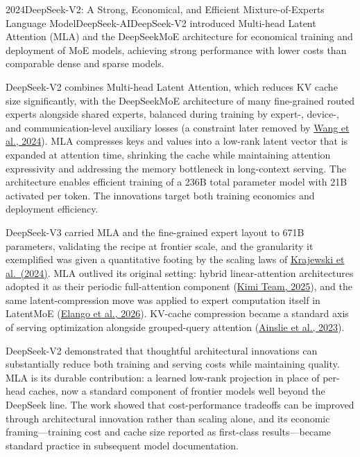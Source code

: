 
\begin{papersummary}{2024}{DeepSeek-V2: A Strong, Economical, and Efficient Mixture-of-Experts Language Model}{DeepSeek-AI}{DeepSeek-V2 introduced Multi-head Latent Attention (MLA) and the DeepSeekMoE architecture for economical training and deployment of MoE models, achieving strong performance with lower costs than comparable dense and sparse models.}

DeepSeek-V2 combines Multi-head Latent Attention, which reduces KV cache size significantly, with the DeepSeekMoE architecture of many fine-grained routed experts alongside shared experts, balanced during training by expert-, device-, and communication-level auxiliary losses (a constraint later removed by \hyperref[paper:wang-2024-auxfree]{Wang et al., 2024}). MLA compresses keys and values into a low-rank latent vector that is expanded at attention time, shrinking the cache while maintaining attention expressivity and addressing the memory bottleneck in long-context serving. The architecture enables efficient training of a 236B total parameter model with 21B activated per token. The innovations target both training economics and deployment efficiency.

DeepSeek-V3 carried MLA and the fine-grained expert layout to 671B parameters, validating the recipe at frontier scale, and the granularity it exemplified was given a quantitative footing by the scaling laws of \hyperref[paper:krajewski-2024]{Krajewski et al.\ (2024)}. MLA outlived its original setting: hybrid linear-attention architectures adopted it as their periodic full-attention component (\hyperref[paper:kimi-2025-linear]{Kimi Team, 2025}), and the same latent-compression move was applied to expert computation itself in LatentMoE (\hyperref[paper:elango-2026-latentmoe]{Elango et al., 2026}). KV-cache compression became a standard axis of serving optimization alongside grouped-query attention (\hyperref[paper:ainslie-2023-gqa]{Ainslie et al., 2023}).

DeepSeek-V2 demonstrated that thoughtful architectural innovations can substantially reduce both training and serving costs while maintaining quality. MLA is its durable contribution: a learned low-rank projection in place of per-head caches, now a standard component of frontier models well beyond the DeepSeek line. The work showed that cost-performance tradeoffs can be improved through architectural innovation rather than scaling alone, and its economic framing---training cost and cache size reported as first-class results---became standard practice in subsequent model documentation.

\end{papersummary}
